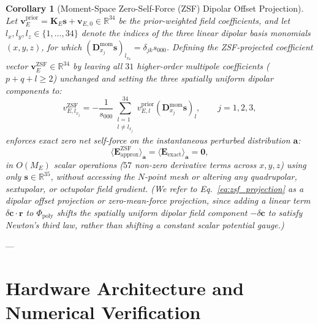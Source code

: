\documentclass[11pt,a4paper]{article}
\newtheorem{corollary}[theorem]{Corollary}
\begin{document}
\begin{corollary}[Moment-Space Zero-Self-Force (ZSF) Dipolar Offset Projection]
\label{cor:zsf_gauge}
Let $\bm{v}_E^{\mathrm{prior}} = \bm{K}_E\bm{s} + \bm{v}_{E,0} \in \mathbb{R}^{34}$ be the prior-weighted field coefficients, and let $l_x, l_y, l_z \in \{1,\dots,34\}$ denote the indices of the three linear dipolar basis monomials $(x, y, z)$, for which $(\bm{D}_{x_j}^{\mathrm{mom}}\bm{s})_{l_{x_k}} = \delta_{jk} s_{000}$. Defining the ZSF-projected coefficient vector $\bm{v}_E^{\mathrm{ZSF}} \in \mathbb{R}^{34}$ by leaving all $31$ higher-order multipole coefficients ($p+q+l \ge 2$) unchanged and setting the three spatially uniform dipolar components to:
\begin{equation}
    v_{E, l_{x_j}}^{\mathrm{ZSF}} = -\frac{1}{s_{000}} \sum_{\substack{l=1 \\ l \ne l_{x_j}}}^{34} v_{E, l}^{\mathrm{prior}} \left( \bm{D}_{x_j}^{\mathrm{mom}} \bm{s} \right)_l, \qquad j = 1, 2, 3,
    \label{eq:zsf_projection}
\end{equation}
enforces exact zero net self-force on the instantaneous perturbed distribution $\bm{a}$:
\begin{equation}
    \langle \bm{E}_{\mathrm{approx}}^{\mathrm{ZSF}} \rangle_{\bm{a}} = \langle \bm{E}_{\mathrm{exact}} \rangle_{\bm{a}} = \bm{0},
    \label{eq:zsf_exact_zero}
\end{equation}
in $O(M_E)$ scalar operations ($57$ non-zero derivative terms across $x, y, z$) using only $\bm{s} \in \mathbb{R}^{35}$, without accessing the $N$-point mesh or altering any quadrupolar, sextupolar, or octupolar field gradient. (We refer to Eq.~\eqref{eq:zsf_projection} as a \emph{dipolar offset projection} or \emph{zero-mean-force projection}, since adding a linear term $\delta\bm{c}\cdot\bm{r}$ to $\Phi_{\mathrm{poly}}$ shifts the spatially uniform dipolar field component $-\delta\bm{c}$ to satisfy Newton's third law, rather than shifting a constant scalar potential gauge.)
\end{corollary}

---

\section{Hardware Architecture and Numerical Verification}
\end{document}
